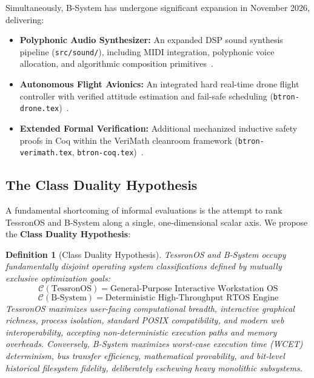 \documentclass[10pt,journal,compsoc,twocolumn]{article}
\newtheorem{definition}{Definition}
\begin{document}
Simultaneously, B-System has undergone significant expansion in November 2026, delivering:
\begin{itemize}[leftmargin=*]
    \item \textbf{Polyphonic Audio Synthesizer:} An expanded DSP sound synthesis pipeline (\texttt{src/sound/}), including MIDI integration, polyphonic voice allocation, and algorithmic composition primitives~\cite{sokhatsky2026sound}.
    \item \textbf{Autonomous Flight Avionics:} An integrated hard real-time drone flight controller with verified attitude estimation and fail-safe scheduling (\texttt{btron-drone.tex})~\cite{sokhatsky2026drone}.
    \item \textbf{Extended Formal Verification:} Additional mechanized inductive safety proofs in Coq within the VeriMath cleanroom framework (\texttt{btron-verimath.tex}, \texttt{btron-coq.tex})~\cite{sokhatsky2026verimath}.
\end{itemize}

\subsection{The Class Duality Hypothesis}
A fundamental shortcoming of informal evaluations is the attempt to rank TessronOS and B-System along a single, one-dimensional scalar axis. We propose the \textbf{Class Duality Hypothesis}:
\begin{definition}[Class Duality Hypothesis]
TessronOS and B-System occupy fundamentally disjoint operating system classifications defined by mutually exclusive optimization goals:
\begin{equation}
\mathcal{C}(\text{TessronOS}) = \text{General-Purpose Interactive Workstation OS}
\end{equation}
\begin{equation}
\mathcal{C}(\text{B-System}) = \text{Deterministic High-Throughput RTOS Engine}
\end{equation}
TessronOS maximizes user-facing computational breadth, interactive graphical richness, process isolation, standard POSIX compatibility, and modern web interoperability, accepting non-deterministic execution paths and memory overheads. Conversely, B-System maximizes worst-case execution time (WCET) determinism, bus transfer efficiency, mathematical provability, and bit-level historical filesystem fidelity, deliberately eschewing heavy monolithic subsystems.
\end{definition}
\end{document}
